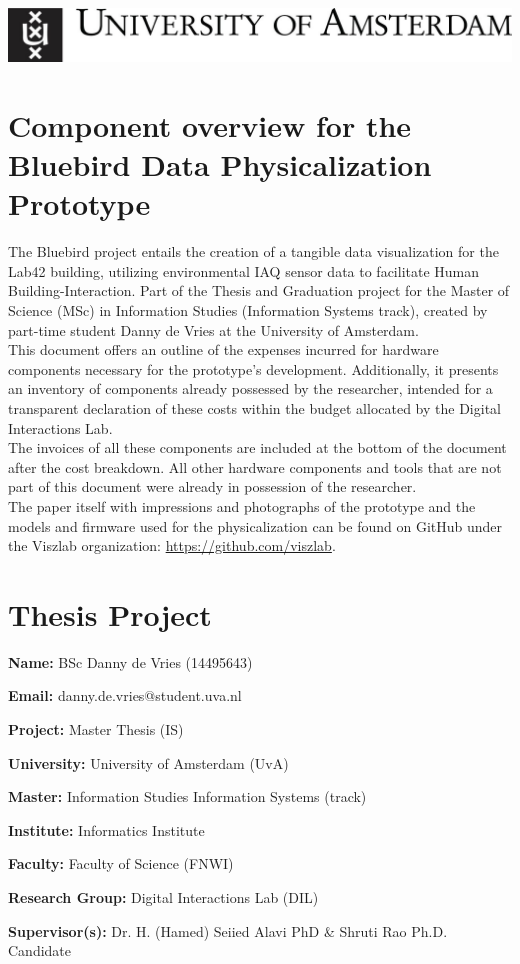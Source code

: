 \documentclass[a4paper]{article}
\begin{document}
\includegraphics[scale=0.2]{uva-logo.jpg} \\

\section*{Component overview for the Bluebird Data Physicalization Prototype}

The Bluebird project entails the creation of a tangible data visualization for the Lab42 building, utilizing environmental IAQ sensor data to facilitate Human Building-Interaction. Part of the Thesis and Graduation project for the Master of Science (MSc) in Information Studies (Information Systems track), created by part-time student Danny de Vries at the University of Amsterdam. \\

This document offers an outline of the expenses incurred for hardware components necessary for the prototype's development. Additionally, it presents an inventory of components already possessed by the researcher, intended for a transparent declaration of these costs within the budget allocated by the Digital Interactions Lab. \\

The invoices of all these components are included at the bottom of the document after the cost breakdown. All other hardware components and tools that are not part of this document were already in possession of the researcher. \\

The paper itself with impressions and photographs of the prototype and the models and firmware used for the physicalization can be found on GitHub under the Viszlab organization: \underline{https://github.com/viszlab}.


\section*{Thesis Project}

\begin{description}
  \item \textbf{Name:} BSc Danny de Vries (14495643)
  \item \textbf{Email:} danny.de.vries@student.uva.nl
  \item \textbf{Project:} Master Thesis (IS)
  \item \textbf{University:} University of Amsterdam (UvA)
  \item \textbf{Master:} Information Studies Information Systems (track)
  \item \textbf{Institute:} Informatics Institute
  \item \textbf{Faculty:} Faculty of Science (FNWI)
  \item \textbf{Research Group:} Digital Interactions Lab (DIL)
  \item \textbf{Supervisor(s):} Dr. H. (Hamed) Seiied Alavi PhD \& Shruti Rao Ph.D. Candidate
\end{description}
\end{document}
